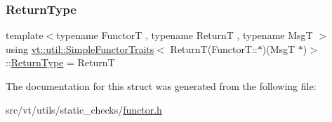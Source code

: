 \subsubsection{\texorpdfstring{Return\+Type}{ReturnType}}
{\footnotesize\ttfamily template$<$typename FunctorT , typename ReturnT , typename MsgT $>$ \\
using \hyperlink{structvt_1_1util_1_1_simple_functor_traits}{vt\+::util\+::\+Simple\+Functor\+Traits}$<$ ReturnT(Functor\+T\+::$\ast$)(MsgT $\ast$)$>$\+::\hyperlink{structvt_1_1util_1_1_simple_functor_traits_3_01_return_t_07_functor_t_1_1_5_08_07_msg_t_01_5_08_4_a6206f7c51b883694c10046d5c92d1469}{Return\+Type} =  ReturnT}



The documentation for this struct was generated from the following file\+:\begin{DoxyCompactItemize}
\item 
src/vt/utils/static\+\_\+checks/\hyperlink{functor_8h}{functor.\+h}\end{DoxyCompactItemize}
